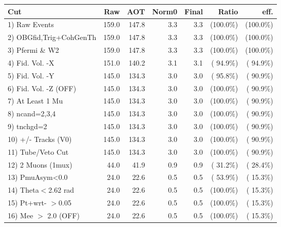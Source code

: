  \begin{table}[h!]\centering
 \begin{tabular}{||l||r|r|r|r|r|r||}
 \hline
 \hline
 Cut & Raw & AOT & Norm0 & Final & Ratio & eff.       \\
 \hline
  1) Raw Events           &        159.0 &        147.8 &          3.3 &          3.3 & (100.0\%) & (100.0\%) \\
  2) OBGfid,Trig+CohGenTh &        159.0 &        147.8 &          3.3 &          3.3 & (100.0\%) & (100.0\%) \\
  3) Pfermi \& W2         &        159.0 &        147.8 &          3.3 &          3.3 & (100.0\%) & (100.0\%) \\
  4) Fid. Vol. -X         &        151.0 &        140.2 &          3.1 &          3.1 & ( 94.9\%) & ( 94.9\%) \\
  5) Fid. Vol. -Y         &        145.0 &        134.3 &          3.0 &          3.0 & ( 95.8\%) & ( 90.9\%) \\
  6) Fid. Vol. -Z (OFF)   &        145.0 &        134.3 &          3.0 &          3.0 & (100.0\%) & ( 90.9\%) \\
  7) At Least 1 Mu        &        145.0 &        134.3 &          3.0 &          3.0 & (100.0\%) & ( 90.9\%) \\
  8) ncand=2,3,4          &        145.0 &        134.3 &          3.0 &          3.0 & (100.0\%) & ( 90.9\%) \\
  9) tnchgd=2             &        145.0 &        134.3 &          3.0 &          3.0 & (100.0\%) & ( 90.9\%) \\
 10) +/- Tracks (V0)      &        145.0 &        134.3 &          3.0 &          3.0 & (100.0\%) & ( 90.9\%) \\
 11) Tube/Veto Cut        &        145.0 &        134.3 &          3.0 &          3.0 & (100.0\%) & ( 90.9\%) \\
 12) 2 Muons (1mux)       &         44.0 &         41.9 &          0.9 &          0.9 & ( 31.2\%) & ( 28.4\%) \\
 13) PmuAsym<0.0          &         24.0 &         22.6 &          0.5 &          0.5 & ( 53.9\%) & ( 15.3\%) \\
 14) Theta$<$2.62 rad     &         24.0 &         22.6 &          0.5 &          0.5 & (100.0\%) & ( 15.3\%) \\
 15) Pt+wrt- $>$0.05      &         24.0 &         22.6 &          0.5 &          0.5 & (100.0\%) & ( 15.3\%) \\
 16) Mee $>$ 2.0  (OFF)   &         24.0 &         22.6 &          0.5 &          0.5 & (100.0\%) & ( 15.3\%) \\

\end{tabular}
\end{table}
